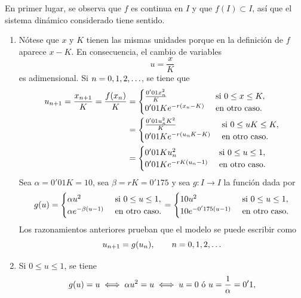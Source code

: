 \documentclass[11pt]{report}
\begin{document}
\begin{solution}
    En primer lugar, se observa que $f$ es continua en $I$ y que $f(I) \subset I$, así que el sistema dinámico considerado tiene sentido.
    \begin{enumerate}
        \item Nótese que $x$ y $K$ tienen las mismas unidades porque en la definición de $f$ aparece $x-K$. En consecuencia, el cambio de variables
        \[u = \frac{x}{K}\]
        es adimensional. Si $n = 0,1,2,\mathellipsis$, se tiene que
        \begin{align*}
            u_{n+1} = \frac{x_{n+1}}{K} = \frac{f(x_n)}{K} &= \begin{cases}
                \frac{0'01 x_n^2}{K} & $ si $ 0 \leq x \leq K, \\
                0'01Ke^{-r(x_n-K)} & $ en otro caso$.
            \end{cases} \\ &=  \begin{cases}
                \frac{0'01 u_n^2K^2}{K} & $ si $ 0 \leq uK \leq K, \\
                0'01Ke^{-r(u_nK-K)} & $ en otro caso$.
            \end{cases} \\ &= \begin{cases}
                0'01Ku_n^2 & $ si $ 0 \leq u \leq 1, \\
                0'01Ke^{-rK(u_n-1)} & $ en otro caso$.
            \end{cases}
        \end{align*}
        Sea $\alpha = 0'01K = 10$, sea $\beta = rK = 0'175$ y sea $g \colon I \to I$ la función dada por
        \[g(u) = \begin{cases}
            \alpha u^2 & $ si $ 0 \leq u \leq 1, \\
            \alpha e^{-\beta(u-1)} & $ en otro caso$.
        \end{cases} = \begin{cases}
            10 u^2 & $ si $ 0 \leq u \leq 1, \\
            10 e^{-0'175(u-1)} & $ en otro caso$.
        \end{cases}\]
        Los razonamientos anteriores prueban que el modelo se puede escribir como
        \[u_{n+1} = g(u_n), \qquad n = 0,1,2,\mathellipsis\]
        \item Si $0 \leq u \leq 1$, se tiene
        \[g(u) = u \iff \alpha u^2 = u \iff u = 0 \textup{ ó } u = \frac{1}{\alpha} = 0'1,\]

\end{enumerate}
\end{solution}
\end{document}
